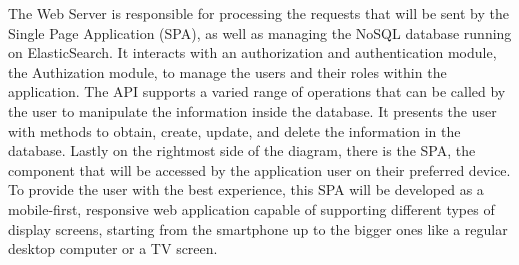 \documentclass[a4paper,twoside,10pt]{report}
\begin{document}
The Web Server is responsible for processing the requests that will be sent by the Single Page Application (SPA), as well as managing the NoSQL database running on ElasticSearch\cite{ES}.
\newline
It interacts with an authorization and authentication module, the Authization module, to manage the users and their roles within the application.
\newline
The API supports a varied range of operations that can be called by the user to manipulate the information inside the database. It presents the user with methods to obtain, create, update, and delete the information in the database.
\newline
Lastly on the rightmost side of the diagram, there is the SPA, the component that will be accessed by the application user on their preferred device.
\newline
To provide the user with the best experience, this SPA will be developed as a mobile-first, responsive web application capable of supporting different types of display screens, starting from the smartphone up to the bigger ones like a regular desktop computer or a TV screen.
\newpage
\end{document}
